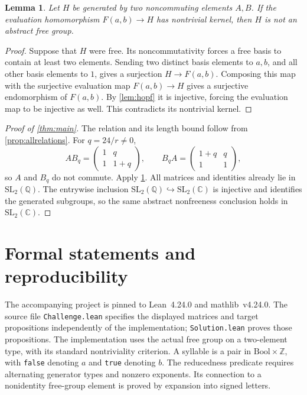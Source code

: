 \documentclass[11pt]{article}
\newtheorem{lemma}[theorem]{Lemma}
\theoremstyle{definition}
\theoremstyle{remark}
\numberwithin{equation}{section}
\newcommand{\Z}{\mathbb Z}
\newcommand{\Q}{\mathbb Q}
\newcommand{\C}{\mathbb C}
\newcommand{\SL}{\mathrm{SL}}
\newcommand{\F}{F(a,b)}
\begin{document}
\begin{lemma}\label{lem:bridge}
Let $H$ be generated by two noncommuting elements $A,B$.
If the evaluation homomorphism $\F\to H$ has nontrivial kernel,
then $H$ is not an abstract free group.
\end{lemma}
\begin{proof}
Suppose that $H$ were free. Its noncommutativity forces a free basis
to contain at least two elements. Sending two distinct basis elements
to $a,b$, and all other basis elements to $1$, gives a surjection
$H\to\F$. Composing this map with the surjective evaluation map
$\F\to H$ gives a surjective endomorphism of $\F$.
By \cref{lem:hopf} it is injective, forcing the evaluation map to
be injective as well. This contradicts its nontrivial kernel.
\end{proof}

\begin{proof}[Proof of \cref{thm:main}]
The relation and its length bound follow from
\cref{prop:allrelations}. For $q=24/r\ne0$,
\[
 AB_q=\begin{pmatrix}1&q\\1&1+q\end{pmatrix},\qquad
 B_qA=\begin{pmatrix}1+q&q\\1&1\end{pmatrix},
\]
so $A$ and $B_q$ do not commute. Apply \cref{lem:bridge}.
All matrices and identities already lie in $\SL_2(\Q)$.
The entrywise inclusion $\SL_2(\Q)\hookrightarrow\SL_2(\C)$
is injective and identifies the generated subgroups, so the same
abstract nonfreeness conclusion holds in $\SL_2(\C)$.
\end{proof}

\section{Formal statements and reproducibility}\label{sec:formal}
The accompanying project is pinned to Lean~4.24.0 and
mathlib~v4.24.0. The source file \texttt{Challenge.lean} specifies
the displayed matrices and target propositions independently of
the implementation; \texttt{Solution.lean} proves those
propositions. The implementation uses the actual free group on a
two-element type, with its standard nontriviality criterion.
A syllable is a pair in $\mathrm{Bool}\times\Z$, with
\texttt{false} denoting $a$ and \texttt{true} denoting $b$.
The reducedness predicate requires alternating generator types and
nonzero exponents. Its connection to a nonidentity free-group element
is proved by expansion into signed letters.
\end{document}
